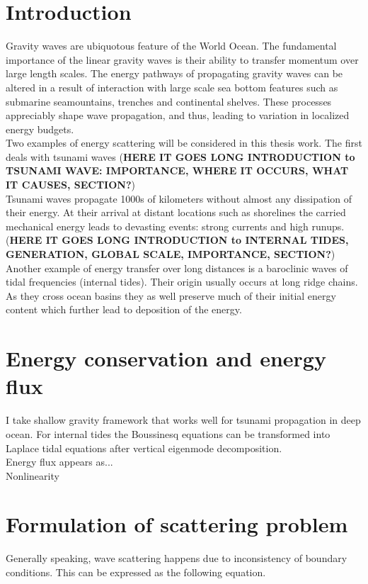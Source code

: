 \section{Introduction}
Gravity waves are ubiquotous feature of the World Ocean. The fundamental importance of the linear gravity waves is their ability to transfer momentum over large length scales. The energy pathways of propagating gravity waves can be altered in a result of interaction with large scale sea bottom features such as submarine seamountains, trenches and continental shelves. These processes appreciably shape wave propagation, and thus, leading to variation in localized energy budgets.\\
Two examples of energy scattering will be considered in this thesis work. The first deals with tsunami waves (\textbf{HERE IT GOES LONG INTRODUCTION to TSUNAMI WAVE: IMPORTANCE, WHERE IT OCCURS, WHAT IT CAUSES, SECTION?})\\
Tsunami waves propagate 1000s of kilometers without almost any dissipation of their energy. At their arrival at distant locations such as shorelines the carried mechanical energy leads to devasting events: strong currents and high runups.\\
(\textbf{HERE IT GOES LONG INTRODUCTION to INTERNAL TIDES, GENERATION, GLOBAL SCALE, IMPORTANCE, SECTION?})\\
Another example of energy transfer over long distances is a baroclinic waves of tidal frequencies (internal tides). Their origin usually occurs at long ridge chains. As they cross ocean basins they as well preserve much of their initial energy content which further lead to deposition of the energy.\\

\section{Energy conservation and energy flux}
I take shallow gravity framework that works well for tsunami propagation in deep ocean. For internal tides the Boussinesq equations can be transformed into Laplace tidal equations after vertical eigenmode decomposition.\\

Energy flux appears as...\\
Nonlinearity\\

\section{Formulation of scattering problem}
Generally speaking, wave scattering happens due to inconsistency of boundary conditions. This can be expressed as the following equation.

